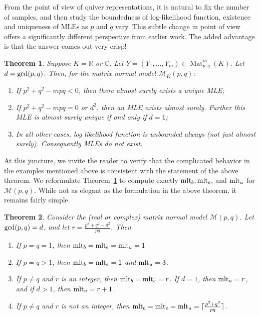 \documentclass[11pt]{amsart}
\newtheorem{theorem}{Theorem}[section]
\theoremstyle{definition}
\newcommand{\R}{{\mathbb R}}
\newcommand{\mlt}{{\rm mlt}}
\newcommand{\C}{{\mathbb C}}
\newcommand{\Mat}{\operatorname{Mat}}
\begin{document}
From the point of view of quiver representations, it is natural to fix the number of samples, and then study the boundedness of log-likelihood function, existence and uniqueness of MLEs as $p$ and $q$ vary. This subtle change in point of view offers a significantly different perspective from earlier work. The added advantage is that the answer comes out very crisp!

\begin{theorem} \label{theo-main-mnm}
Suppose $K = \R$ or $\C$. Let $Y = (Y_1,\dots,Y_m) \in \Mat_{p,q}^m(K)$. Let $d = {\rm gcd}(p,q)$. Then, for the matrix normal model $\mathcal{M}_K(p,q)$:
\begin{enumerate}
\item If $p^2 + q^2 - mpq < 0$, then there almost surely exists a unique MLE;
\item If $p^2 + q^2 - mpq = 0$ or $d^2$, then an MLE exists almost surely. Further this MLE is almost surely unique  if and only if $d = 1$;
\item In all other cases, log likelihood function is unbounded always (not just almost surely). Consequently MLEs do not exist. 
\end{enumerate}
\end{theorem}

At this juncture, we invite the reader to verify that the complicated behavior in the examples mentioned above is consistent with the statement of the above theorem. We reformulate Theorem~\ref{theo-main-mnm} to compute exactly $\mlt_b,\mlt_e,$ and $\mlt_u$ for $\mathcal{M}(p,q)$. While not as elegant as the formulation in the above theorem, it remains fairly simple.  

\begin{theorem} \label{theo-thresh-mnm}
Consider the (real or complex) matrix normal model $\mathcal{M}(p,q)$. Let ${\rm gcd}(p,q) = d$, and let $r = \displaystyle \frac{p^2 + q^2 - d^2}{pq}$. Then 
\begin{enumerate}
\item If $p = q = 1$, then $\mlt_b = \mlt_e = \mlt_u = 1$
\item If $p = q >1$, then $\mlt_b = \mlt_e = 1$ and $\mlt_u = 3$.
\item If $p \neq q$ and $r$ is an integer, then $\mlt_b = \mlt_e =  r$. If $d = 1$, then $\mlt_u = r$, and if $d > 1$, then $\mlt_u  = r + 1$.
\item If $p \neq q$ and $r$ is not an integer, then $\mlt_b = \mlt_e = \mlt_u = \lceil \frac{p^2 + q^2}{pq} \rceil$.
\end{enumerate}
\end{theorem}
\end{document}
